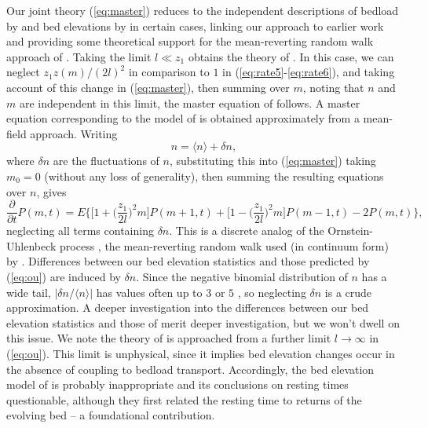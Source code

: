 \documentclass[draft]{agujournal2018}
\newcommand\be{\begin{equation}} %
\newcommand\ee{\end{equation}}   %
\newcommand\bra{\langle}
\newcommand\ket{\rangle}
\begin{document}
Our joint theory (\ref{eq:master}) reduces to the independent descriptions of bedload by \citet{Ancey2008} and bed elevations by \citet{Martin2014} in certain cases, linking our approach to earlier work and providing some theoretical support for the mean-reverting random walk approach of \citet{Martin2014}.
Taking the limit $l\ll z_1$ obtains the theory of \citet{Ancey2008}.
In this case, we can neglect $z_1 z(m)/(2l)^2$ in comparison to $1$ in (\ref{eq:rate5}-\ref{eq:rate6}), and taking account of this change in (\ref{eq:master}), then summing over $m$, noting that $n$ and $m$ are independent in this limit, the master equation of \citet{Ancey2008} follows.
A master equation corresponding to the model of \citet{Martin2014} is obtained approximately from a mean-field approach.
Writing
\be n = \bra n \ket + \delta n \label{eq:mft}, \ee
where $\delta n$ are the fluctuations of $n$,  substituting this into (\ref{eq:master}) taking $m_0=0$ (without any loss of generality), then summing the resulting equations over $n$, gives
\be \frac{\partial}{\partial t}P(m,t) =  E \Big\{ \Big[1 +\Big(\frac{z_1}{2 l}\Big)^2m\Big]P(m+1,t) +  \Big[1 -\Big(\frac{z_1}{2 l}\Big)^2m\Big]P(m-1,t) - 2P(m,t)\Big\}, \label{eq:ou}\ee
neglecting all terms containing $\delta n$.
This is a discrete analog of the Ornstein-Uhlenbeck process \citep[e.g.][]{Gillespie1992}, the mean-reverting random walk used (in continuum form) by \citep{Martin2014}.
Differences between our bed elevation statistics and those predicted by (\ref{eq:ou}) are induced by $\delta n$.
Since the negative binomial distribution of $n$ has a wide tail, $|\delta n/\bra n \ket|$ has values often up to $3$ or $5$ \citep{Ancey2008}, so neglecting $\delta n$ is a crude approximation.
A deeper investigation into the differences between our bed elevation statistics and those of \citet{Martin2014} merit deeper investigation, but we won't dwell on this issue.
We note the theory of \citet{Voepel2013} is approached from a further limit $l\rightarrow \infty$ in (\ref{eq:ou}).
This limit is unphysical, since it implies bed elevation changes occur in the absence of coupling to bedload transport.
Accordingly, the bed elevation model of \citet{Voepel2013} is probably inappropriate and its conclusions on resting times questionable, although they first related the resting time to returns of the evolving bed --  a foundational contribution.
\end{document}
